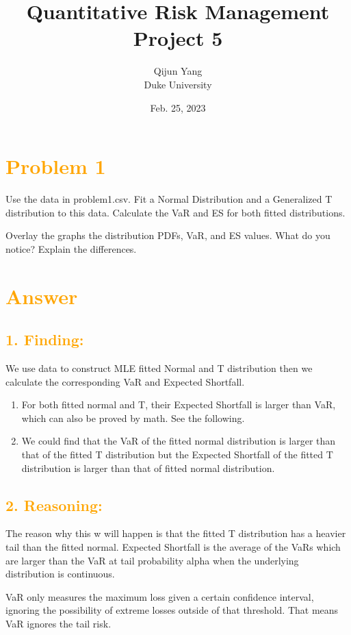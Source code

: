\documentclass[11pt,en]{elegantpaper}
\title{Quantitative Risk Management Project 5}
\author{Qijun Yang \\ Duke University}
\institute{\href{https://fintech.meng.duke.edu}{Financial Technology at Duke University}}
\date{Feb. 25, 2023}
\begin{document}
\maketitle

\section*{\textcolor{orange}{Problem 1}}

Use the data in problem1.csv. Fit a Normal Distribution and a Generalized T distribution to this data.
Calculate the VaR and ES for both fitted distributions.

Overlay the graphs the distribution PDFs, VaR, and ES values. What do you notice? Explain the
differences.

\section*{\textcolor{orange}{Answer}}

\subsection*{\textcolor{orange}{1. Finding:}}


We use data to construct MLE fitted Normal and T distribution then we calculate the corresponding VaR and Expected Shortfall.
\begin{enumerate}
 \item For both fitted normal and T, their Expected Shortfall is larger than VaR, which can also be proved by math. See the following.
 \item We could find that the VaR of the fitted normal distribution is larger than that of the fitted T distribution but the Expected Shortfall of the fitted T distribution is larger than that of fitted normal distribution. 
\end{enumerate}

\subsection*{\textcolor{orange}{2. Reasoning:}}

The reason why this w will happen is that the fitted T distribution has a heavier tail than the fitted normal. Expected Shortfall is the average of the VaRs which are larger than the VaR at tail probability alpha when the underlying distribution is continuous. 

VaR only measures the maximum loss given a certain confidence interval, ignoring the possibility of extreme losses outside of that threshold. 
That means VaR ignores the tail risk.
\end{document}
